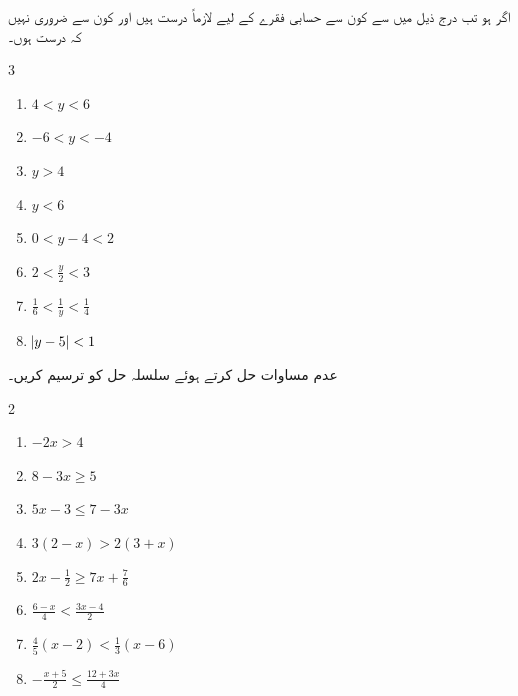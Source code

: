 اگر  ہو تب درج ذیل  میں سے کون سے حسابی فقرے  کے لیے لازماً درست ہیں اور کون سے ضروری نہیں کہ درست ہوں۔
\begin{multicols}{3}
\begin{enumerate}[a]
\item
$4<y<6$
\item
$-6<y<-4$
\item
$y>4$
\item
$y<6$
\item
$0<y-4<2$
\item
$2<\frac{y}{2}<3$
\item
$\frac{1}{6}<\frac{1}{y}<\frac{1}{4}$
\item
$\abs{y-5}<1$
\end{enumerate}
\end{multicols} 
عدم مساوات حل کرتے ہوئے سلسلہ حل کو ترسیم کریں۔
\begin{multicols}{2}
\begin{enumerate}[]
\item
{}
$-2x>4$
\item
{}
$8-3x\ge 5$
\item
{}
$5x-3\le 7-3x$
\item
{}
$3(2-x)>2(3+x)$
\item
{}
$2x-\frac{1}{2}\ge 7x+\frac{7}{6}$
\item
{}
$\frac{6-x}{4}<\frac{3x-4}{2}$
\item
{}
$\frac{4}{5}(x-2)<\frac{1}{3}(x-6)$
\item
{}
$-\frac{x+5}{2}\le \frac{12+3x}{4}$
\end{enumerate}
\end{multicols}

